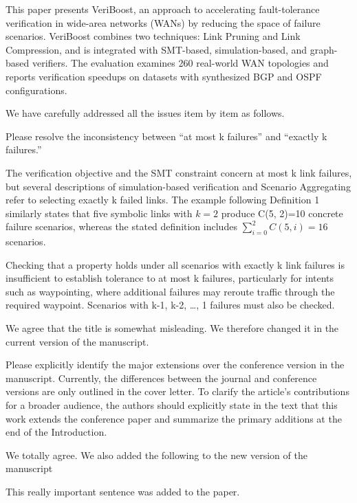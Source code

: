 
\reviewer%

\begin{generalcomment}
	This paper presents VeriBoost, 
	an approach to accelerating fault-tolerance verification in wide-area networks (WANs) by reducing the space of failure scenarios. 
	VeriBoost combines two techniques: Link Pruning and Link Compression, 
	and is integrated with SMT-based, simulation-based, and graph-based verifiers. 
	The evaluation examines 260 real-world WAN topologies and reports verification speedups on datasets with synthesized BGP and OSPF configurations.
\end{generalcomment}
\begin{revresponse}
	We have carefully addressed all the issues item by item as follows.
\end{revresponse}

\begin{revcomment}
Please resolve the inconsistency between “at most k failures” and “exactly k failures.”

The verification objective and the SMT constraint concern at most k link failures, but several descriptions of simulation-based verification and Scenario Aggregating refer to selecting exactly k failed links. The example following Definition 1 similarly states that five symbolic links with $k=2$ produce C(5, 2)=10 concrete failure scenarios, whereas the stated definition includes
$\sum_{i=0}^{2}C(5,i)=16$ scenarios.

Checking that a property holds under all scenarios with exactly k link failures is insufficient to establish tolerance to at most k failures, 
particularly for intents such as waypointing, 
where additional failures may reroute traffic through the required waypoint. 
Scenarios with k-1, k-2, \dots, 1 failures must also be checked.
\end{revcomment}
\begin{revresponse}
	We agree that the title is somewhat misleading.
	We therefore changed it in the current version of the manuscript.
\end{revresponse}

\begin{revcomment}
Please explicitly identify the major extensions over the conference version in the manuscript. 
Currently, the differences between the journal and conference versions are only outlined in the cover letter. 
To clarify the article's contributions for a broader audience, 
the authors should explicitly state in the text that this work extends the conference paper and summarize the primary additions at the end of the Introduction.
\end{revcomment}
\begin{revresponse}
	We totally agree. We also added the following to the new version of the manuscript
	\begin{changes}
		This really important sentence was added to the paper.
	\end{changes}
\end{revresponse}

